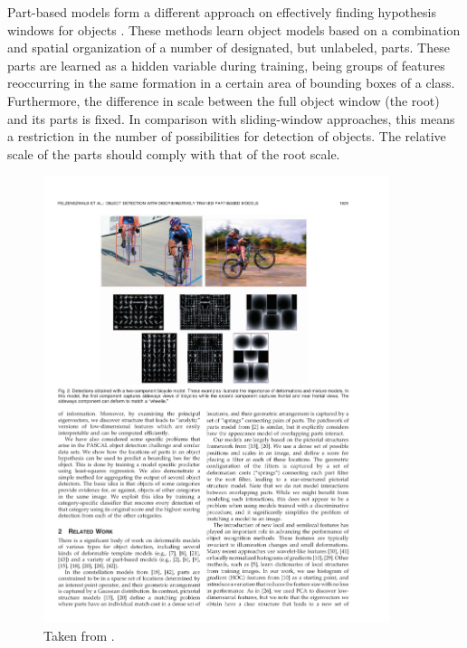 Part-based models form a different approach on effectively finding hypothesis windows for objects \cite{felzenszwalb2010object}. These methods learn object models based on a combination and spatial organization of a number of designated, but unlabeled, parts. These parts are learned as a hidden variable during training, being groups of features reoccurring in the same formation in a certain area of bounding boxes of a class. Furthermore, the difference in scale between the full object window (the root) and its parts is fixed. In comparison with sliding-window approaches, this means a restriction in the number of possibilities for detection of objects. The relative scale of the parts should comply with that of the root scale.


\begin{figure}[hbt]
    \centering
    \includegraphics[width=0.9\textwidth]{PartBasedDet}
    \caption{Taken from \cite{felzenszwalb2010object}.}
    \label{fig:partbaseddet}
\end{figure}

